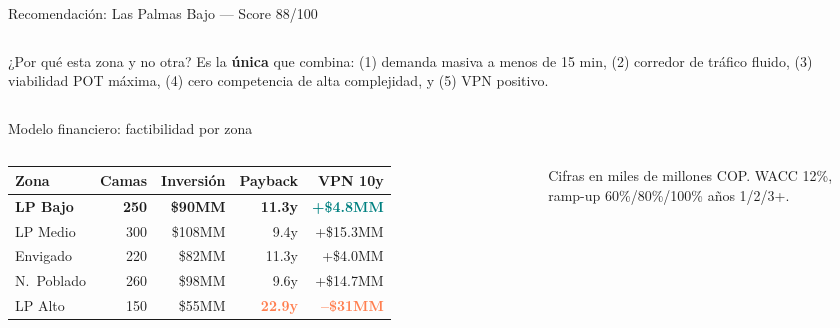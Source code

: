 \documentclass[aspectratio=169, 11pt]{beamer}
\newcommand{\highlight}[1]{\textcolor{teal}{\textbf{#1}}}
\newcommand{\danger}[1]{\textcolor{coral}{\textbf{#1}}}
\begin{document}
{\begin{frame}{Recomendación: Las Palmas Bajo — Score 88/100}
\begin{columns}[T]
\vspace{6pt}
\begin{exampleblock}{\small ¿Por qué esta zona y no otra?}
\footnotesize Es la \textbf{única} que combina: (1) demanda masiva a menos de 15 min, (2) corredor de tráfico fluido, (3) viabilidad POT máxima, (4) cero competencia de alta complejidad, y (5) VPN positivo.
\end{exampleblock}
\end{columns}
\end{frame}
}

\begin{frame}{Modelo financiero: factibilidad por zona}

\begin{columns}[T]
{\footnotesize
\begin{tabular}{@{}l r r r r@{}}
\toprule
\textbf{Zona} & \textbf{Camas} & \textbf{Inversión} & \textbf{Payback} & \textbf{VPN 10y} \\
\midrule
\rowcolor{teal!10}
\textbf{LP Bajo} & \textbf{250} & \textbf{\$90MM} & \textbf{11.3y} & \highlight{+\$4.8MM} \\
LP Medio & 300 & \$108MM & 9.4y & +\$15.3MM \\
Envigado & 220 & \$82MM & 11.3y & +\$4.0MM \\
N.\ Poblado & 260 & \$98MM & 9.6y & +\$14.7MM \\
\rowcolor{coral!8}
LP Alto & 150 & \$55MM & \danger{22.9y} & \danger{--\$31MM} \\
\bottomrule
\end{tabular}
}
{\tiny Cifras en miles de millones COP. WACC 12\%, ramp-up 60\%/80\%/100\% años 1/2/3+.}

\vspace{6pt}


\end{columns}
\end{frame}
\end{document}
